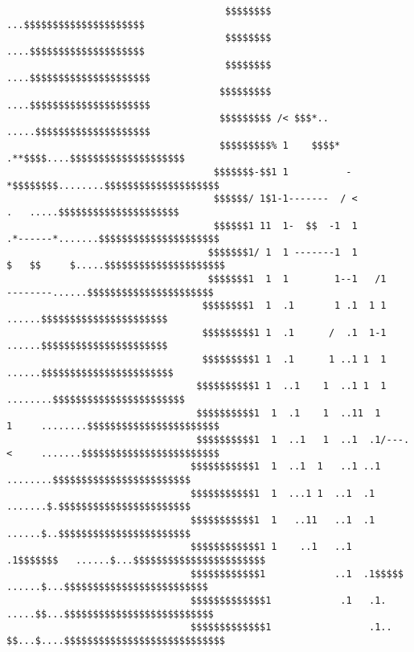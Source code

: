 \begin{verbatim}
                                      $$$$$$$$                                     ...$$$$$$$$$$$$$$$$$$$$$
                                      $$$$$$$$                                     ....$$$$$$$$$$$$$$$$$$$$
                                      $$$$$$$$                                     ....$$$$$$$$$$$$$$$$$$$$$
                                     $$$$$$$$$                                     ....$$$$$$$$$$$$$$$$$$$$$
                                     $$$$$$$$$ /< $$$*..                           .....$$$$$$$$$$$$$$$$$$$$
                                     $$$$$$$$$% 1    $$$$*                   .**$$$$....$$$$$$$$$$$$$$$$$$$$
                                    $$$$$$$-$$1 1          -           *$$$$$$$$........$$$$$$$$$$$$$$$$$$$$
                                    $$$$$$/ 1$1-1-------  / <                 .   .....$$$$$$$$$$$$$$$$$$$$$
                                    $$$$$$1 11  1-  $$  -1  1          .*------*.......$$$$$$$$$$$$$$$$$$$$$
                                   $$$$$$$1/ 1  1 -------1  1         $   $$     $.....$$$$$$$$$$$$$$$$$$$$$
                                   $$$$$$$1  1  1        1--1   /1      --------......$$$$$$$$$$$$$$$$$$$$$$
                                  $$$$$$$$1  1  .1       1 .1  1 1              ......$$$$$$$$$$$$$$$$$$$$$$
                                  $$$$$$$$$1 1  .1      /  .1  1-1              ......$$$$$$$$$$$$$$$$$$$$$$
                                  $$$$$$$$$1 1  .1      1 ..1 1  1             ......$$$$$$$$$$$$$$$$$$$$$$$
                                 $$$$$$$$$$1 1  ..1    1  ..1 1  1           ........$$$$$$$$$$$$$$$$$$$$$$$
                                 $$$$$$$$$$1  1  .1    1  ..11  1     1     ........$$$$$$$$$$$$$$$$$$$$$$$
                                 $$$$$$$$$$1  1  ..1   1  ..1  .1/---.<     .......$$$$$$$$$$$$$$$$$$$$$$$$
                                $$$$$$$$$$$1  1  ..1  1   ..1 ..1          ........$$$$$$$$$$$$$$$$$$$$$$$$
                                $$$$$$$$$$$1  1  ...1 1  ..1  .1           .......$.$$$$$$$$$$$$$$$$$$$$$$$
                                $$$$$$$$$$$1  1   ..11   ..1  .1           ......$..$$$$$$$$$$$$$$$$$$$$$$$
                                $$$$$$$$$$$$1 1    ..1   ..1  .1$$$$$$$   ......$...$$$$$$$$$$$$$$$$$$$$$$$
                                $$$$$$$$$$$$1            ..1  .1$$$$$    ......$...$$$$$$$$$$$$$$$$$$$$$$$$$
                                $$$$$$$$$$$$$1            .1   .1.      .....$$...$$$$$$$$$$$$$$$$$$$$$$$$$$
                                $$$$$$$$$$$$$1                 .1..    $$...$....$$$$$$$$$$$$$$$$$$$$$$$$$$$$

\end{verbatim}
